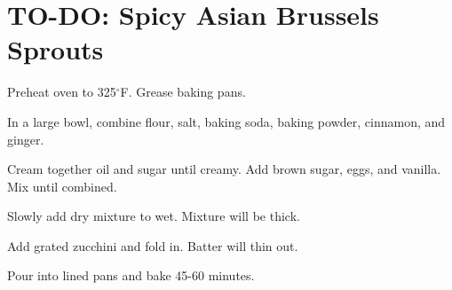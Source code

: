 \section{TO-DO: Spicy Asian Brussels Sprouts}
\begin{recipe}




	Preheat oven to 325$^{\circ}$F. Grease baking pans.

	In a large bowl, combine flour, salt, baking soda, baking powder, cinnamon, and ginger.

	Cream together oil and sugar until creamy. Add brown sugar, eggs, and vanilla. Mix until combined.

	Slowly add dry mixture to wet. Mixture will be thick.

	Add grated zucchini and fold in. Batter will thin out.

	Pour into lined pans and bake 45-60 minutes.



\end{recipe}
